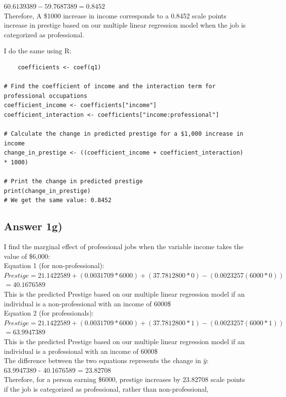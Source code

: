 \documentclass{article}
\begin{document}
\begin{math}
60.6139389 - 59.7687389 = 0.8452    
\end{math}
\\
Therefore, A \$1000 increase in income corresponds to a 0.8452 scale points increase in prestige based on our multiple linear regression model when the job is categorized as professional.

I do the same using R:
\begin{verbatim}
    coefficients <- coef(q1)

# Find the coefficient of income and the interaction term for professional occupations
coefficient_income <- coefficients["income"]
coefficient_interaction <- coefficients["income:professional"]

# Calculate the change in predicted prestige for a $1,000 increase in income
change_in_prestige <- ((coefficient_income + coefficient_interaction) * 1000)

# Print the change in predicted prestige
print(change_in_prestige)
# We get the same value: 0.8452

\end{verbatim}

\subsection{Answer 1g)}
I find the marginal effect of professional jobs when the variable income takes the value of \$6,000:
\\
Equation 1 (for non-professional):
\\
\noindent $Prestige = 21.1422589 + (0.0031709*6000) + (37.7812800*0) -(0.0023257(6000*0))$
\\
$= 40.1676589$
\\
This is the predicted Prestige based on our multiple linear regression model if an individual is a non-professional with an income of 6000\$
\\
Equation 2 (for professionals):
\\
$Prestige = 21.1422589 + (0.0031709*6000) + (37.7812800*1) -(0.0023257(6000*1))$
\\
$= 63.9947389$
\\
This is the predicted Prestige based on our multiple linear regression model if an individual is a professional with an income of 6000\$
\\
The difference between the two equations represents the change in $\hat{y}$:
\\
63.9947389 - 40.1676589 = 23.82708
\\
Therefore, for a person earning \$6000, prestige increases by 23.82708 scale points if the job is categorized as professional, rather than non-professional,
\\
\end{document}

